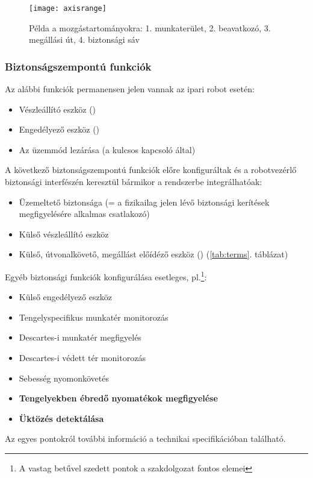 \documentclass[../documentation.tex]{subfiles}
\begin{document}
\begin{figure}[H]
\centering
\texttt{[image: axisrange]}
\caption{Példa a mozgástartományokra: 1. munkaterület, 2. beavatkozó, 3. megállási út, 4. biztonsági sáv}
\label{fig:axisrange}
\end{figure}

\subsubsection{Biztonságszempontú funkciók}
\label{sec:safetyfunctions}
Az alábbi funkciók permanensen jelen vannak az ipari robot esetén:
\begin{itemize}
	\item Vészleállító eszköz ()
	\item Engedélyező eszköz ()
	\item Az üzemmód lezárása (a kulcsos kapcsoló által)
\end{itemize}
A következő biztonságszempontú funkciók előre konfiguráltak és a robotvezérlő biztonsági interfészén keresztül bármikor a rendszerbe integrálhatóak:
\begin{itemize}
	\item Üzemeltető biztonsága (= a fizikailag jelen lévő biztonsági kerítések megfigyelésére alkalmas csatlakozó)
	\item Külső vészleállító eszköz
	\item Külső, útvonalkövető, megállást előídéző eszköz () (\ref{tab:terms}. táblázat)
\end{itemize}
Egyéb biztonsági funkciók konfigurálása esetleges, pl.\footnote{A vastag betűvel szedett pontok a szakdolgozat fontos elemei}:
\begin{itemize}
	\item Külső engedélyező eszköz
	\item Tengelyspecifikus munkatér monitorozás
	\item Descartes-i munkatér megfigyelés
	\item Descartes-i védett tér monitorozás
	\item Sebesség nyomonkövetés
	\item \textbf{Tengelyekben ébredő nyomatékok megfigyelése}
	\item \textbf{Üktözés detektálása}
\end{itemize}
Az egyes pontokról további információ a technikai specifikációban található\cite{sunrisemanual}.
\end{document}
